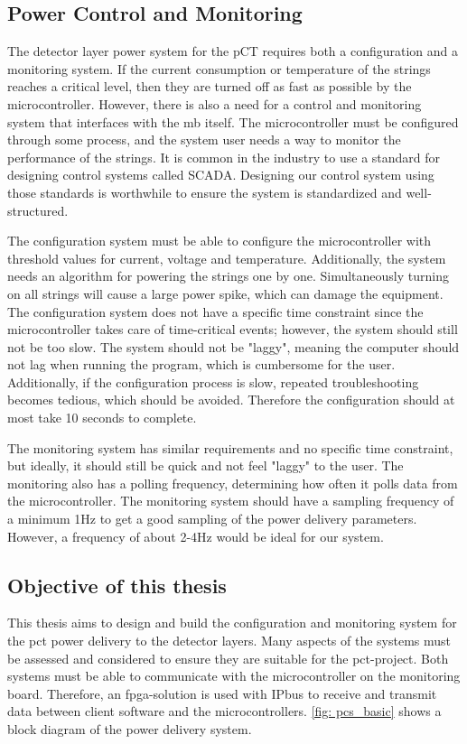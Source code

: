 \documentclass[main.tex]{subfiles}
\begin{document}
\subsection{Power Control and Monitoring}

The detector layer power system for the pCT requires both a configuration and a monitoring system. If the current consumption or temperature of the strings reaches a critical level, then they are turned off as fast as possible by the microcontroller. However, there is also a need for a control and monitoring system that interfaces with the \gls{mb} itself. The microcontroller must be configured through some process, and the system user needs a way to monitor the performance of the strings. It is common in the industry to use a standard for designing control systems called SCADA. Designing our control system using those standards is worthwhile to ensure the system is standardized and well-structured.

The configuration system must be able to configure the microcontroller with threshold values for current, voltage and temperature. Additionally, the system needs an algorithm for powering the strings one by one. Simultaneously turning on all strings will cause a large power spike, which can damage the equipment. The configuration system does not have a specific time constraint since the microcontroller takes care of time-critical events; however, the system should still not be too slow. The system should not be "laggy", meaning the computer should not lag when running the program, which is cumbersome for the user. Additionally, if the configuration process is slow, repeated troubleshooting becomes tedious, which should be avoided. Therefore the configuration should at most take 10 seconds to complete.

The monitoring system has similar requirements and no specific time constraint, but ideally, it should still be quick and not feel "laggy" to the user. The monitoring also has a polling frequency, determining how often it polls data from the microcontroller. The monitoring system should have a sampling frequency of a minimum 1Hz to get a good sampling of the power delivery parameters. However, a frequency of about 2-4Hz would be ideal for our system.

\subsection{Objective of this thesis}

This thesis aims to design and build the configuration and monitoring system for the \gls{pct} power delivery to the detector layers. Many aspects of the systems must be assessed and considered to ensure they are suitable for the \gls{pct}-project. Both systems must be able to communicate with the microcontroller on the monitoring board. Therefore, an \acrshort{fpga}-solution is used with IPbus to receive and transmit data between client software and the microcontrollers. \autoref{fig: pcs_basic} shows a block diagram of the power delivery system.
\end{document}
